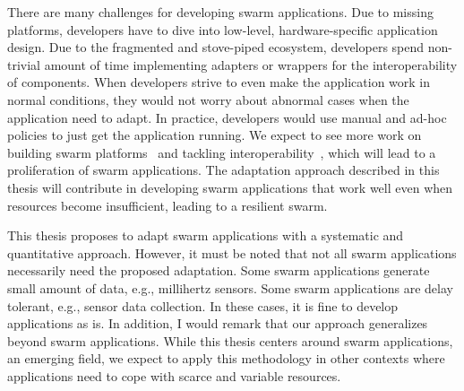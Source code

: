 \documentclass[thesis.tex]{subfiles}
\begin{document}
There are many challenges for developing swarm applications. Due to missing
platforms, developers have to dive into low-level, hardware-specific application
design. Due to the fragmented and stove-piped ecosystem, developers spend
non-trivial amount of time implementing adapters or wrappers for the
interoperability of components. When developers strive to even make the
application work in normal conditions, they would not worry about abnormal cases
when the application need to adapt. In practice, developers would use manual and
ad-hoc policies to just get the application running. We expect to see more work
on building swarm platforms~\cite{mor2016toward, latronico2015vision} and
tackling interoperability~\cite{brooks2018component}, which will lead to a
proliferation of swarm applications. The adaptation approach described in this
thesis will contribute in developing swarm applications that work well even when
resources become insufficient, leading to a resilient swarm.

This thesis proposes to adapt swarm applications with a systematic and
quantitative approach. However, it must be noted that not all swarm applications
necessarily need the proposed adaptation. Some swarm applications generate small
amount of data, e.g., millihertz sensors. Some swarm applications are delay
tolerant, e.g., sensor data collection. In these cases, it is fine to develop
applications as is. In addition, I would remark that our approach generalizes
beyond swarm applications. While this thesis centers around swarm applications,
an emerging field, we expect to apply this methodology in other contexts where
applications need to cope with scarce and variable resources.
\end{document}
